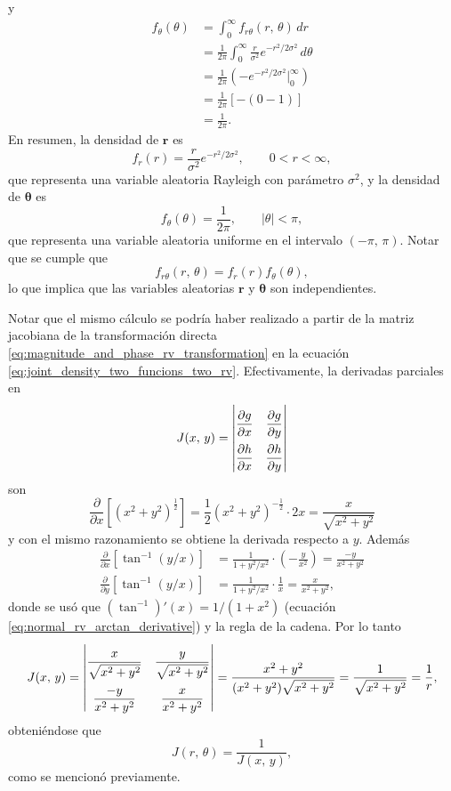 \documentclass[a4paper]{report}
\begin{document}
y
\begin{align*}
 f_\theta(\theta)&=\int_{0}^{\infty}f_{r\theta}(r,\,\theta)\,dr\\
   &=\frac{1}{2\pi}\int_{0}^{\infty}\frac{r}{\sigma^2}e^{-r^2/2\sigma^2}\,d\theta\\   
   &=\frac{1}{2\pi}\left(-e^{-r^2/2\sigma^2}\bigg|_{0}^{\infty}\right)\\
   &=\frac{1}{2\pi}\left[-(0-1)\right]\\
   &=\frac{1}{2\pi}.
\end{align*}
En resumen, la densidad de \(\mathbf{r}\) es
\[
 f_r(r)=\frac{r}{\sigma^2}e^{-r^2/2\sigma^2},\qquad 0<r<\infty,
\]
que representa una variable aleatoria Rayleigh con parámetro \(\sigma^2\), y la densidad de \(\bm{\theta}\) es
\[
 f_\theta(\theta)=\frac{1}{2\pi},\qquad |\theta|<\pi,
\]
que representa una variable aleatoria uniforme en el intervalo \((-\pi,\,\pi)\). Notar que se cumple que
\[
 f_{r\theta}(r,\,\theta)=f_r(r)f_\theta(\theta),
\]
lo que implica que las variables aleatorias \(\mathbf{r}\) y \(\bm{\theta}\) son independientes.

Notar que el mismo cálculo se podría haber realizado a partir de la matriz jacobiana de la transformación directa \ref{eq:magnitude_and_phase_rv_transformation} en la ecuación \ref{eq:joint_density_two_funcions_two_rv}. Efectivamente, la derivadas parciales en
\[
\def\arraystretch{2.2}
 J(x,\,y)=
 \begin{vmatrix}
    \dfrac{\partial g}{\partial x} & \dfrac{\partial g}{\partial y} \\
    \dfrac{\partial h}{\partial x} & \dfrac{\partial h}{\partial y}
\end{vmatrix}
\]
son
\[
 \frac{\partial}{\partial x}\left[(x^2+y^2)^\frac{1}{2}\right]=\frac{1}{2}(x^2+y^2)^{-\frac{1}{2}}\cdot2x=\frac{x}{\sqrt{x^2+y^2}}
\]
y con el mismo razonamiento se obtiene la derivada respecto a \(y\). Además
\begin{align*}
 \frac{\partial}{\partial x}\left[\tan^{-1}(y/x)\right]&=\frac{1}{1+y^2/x^2}\cdot\left(-\frac{y}{x^2}\right)=\frac{-y}{x^2+y^2}\\
 \frac{\partial}{\partial y}\left[\tan^{-1}(y/x)\right]&=\frac{1}{1+y^2/x^2}\cdot\frac{1}{x}=\frac{x}{x^2+y^2},
\end{align*}
donde se usó que \((\tan^{-1})'(x)=1/(1+x^2)\) (ecuación \ref{eq:normal_rv_arctan_derivative}) y la regla de la cadena.
Por lo tanto
\[
 \def\arraystretch{2.2}
 J(x,\,y)=
 \begin{vmatrix}
    \dfrac{x}{\sqrt{x^2+y^2}} & \dfrac{y}{\sqrt{x^2+y^2}} \\
    \dfrac{-y}{x^2+y^2} & \dfrac{x}{x^2+y^2}
\end{vmatrix}
=\frac{x^2+y^2}{(x^2+y^2)\sqrt{x^2+y^2}}=\frac{1}{\sqrt{x^2+y^2}}=\frac{1}{r},
\]
obteniéndose que
\[
 J(r,\,\theta)=\frac{1}{J(x,\,y)},
\]
como se mencionó previamente.
\end{document}
